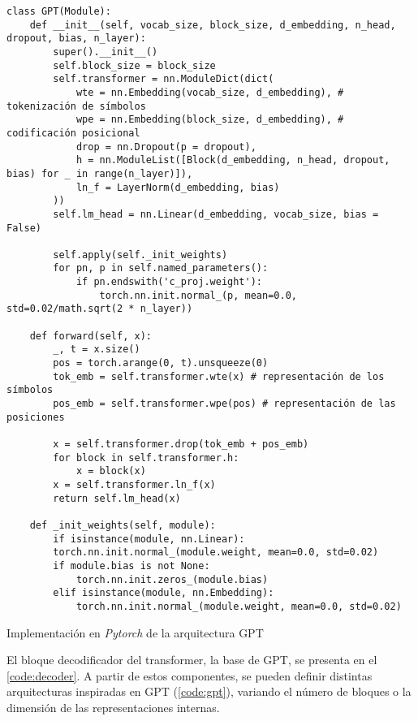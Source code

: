 \begin{code}
\begin{verbatim}
class GPT(Module):
    def __init__(self, vocab_size, block_size, d_embedding, n_head, dropout, bias, n_layer):
        super().__init__()
        self.block_size = block_size
        self.transformer = nn.ModuleDict(dict(
            wte = nn.Embedding(vocab_size, d_embedding), # tokenización de símbolos
            wpe = nn.Embedding(block_size, d_embedding), # codificación posicional
            drop = nn.Dropout(p = dropout),
            h = nn.ModuleList([Block(d_embedding, n_head, dropout, bias) for _ in range(n_layer)]),
            ln_f = LayerNorm(d_embedding, bias)
        ))
        self.lm_head = nn.Linear(d_embedding, vocab_size, bias = False)

        self.apply(self._init_weights)
        for pn, p in self.named_parameters():
            if pn.endswith('c_proj.weight'):
                torch.nn.init.normal_(p, mean=0.0, std=0.02/math.sqrt(2 * n_layer))

    def forward(self, x):
        _, t = x.size()
        pos = torch.arange(0, t).unsqueeze(0)
        tok_emb = self.transformer.wte(x) # representación de los símbolos
        pos_emb = self.transformer.wpe(pos) # representación de las posiciones

        x = self.transformer.drop(tok_emb + pos_emb)
        for block in self.transformer.h:
            x = block(x)
        x = self.transformer.ln_f(x)
        return self.lm_head(x)

    def _init_weights(self, module):
        if isinstance(module, nn.Linear):
        torch.nn.init.normal_(module.weight, mean=0.0, std=0.02)
        if module.bias is not None:
            torch.nn.init.zeros_(module.bias)
        elif isinstance(module, nn.Embedding):
            torch.nn.init.normal_(module.weight, mean=0.0, std=0.02)

\end{verbatim}
\caption{Implementación en \textit{Pytorch} de la arquitectura GPT}
\label{code:gpt}
\end{code}

El bloque decodificador del transformer, la base de GPT, se presenta en el \cref{code:decoder}. A partir de estos componentes, se pueden definir distintas arquitecturas inspiradas en GPT (\cref{code:gpt}), variando el número de bloques o la dimensión de las representaciones internas. 

